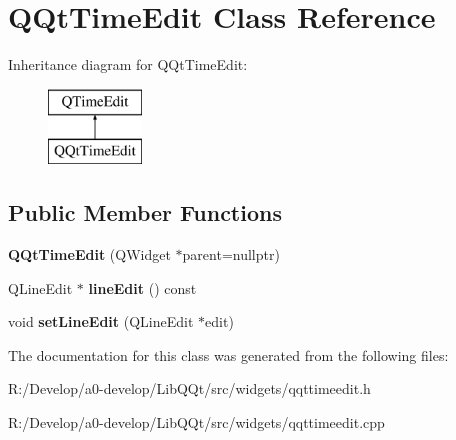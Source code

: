 \hypertarget{class_q_qt_time_edit}{}\section{Q\+Qt\+Time\+Edit Class Reference}
\label{class_q_qt_time_edit}
Inheritance diagram for Q\+Qt\+Time\+Edit\+:\begin{figure}[H]
\begin{center}
\leavevmode
\includegraphics[height=2.000000cm]{class_q_qt_time_edit}
\end{center}
\end{figure}
\subsection*{Public Member Functions}
\begin{DoxyCompactItemize}
\item 
\mbox{\label{class_q_qt_time_edit_a2bc3924b5ea17d6c2279505c8f0780b3}} 
{\bfseries Q\+Qt\+Time\+Edit} (Q\+Widget $\ast$parent=nullptr)
\item 
\mbox{\label{class_q_qt_time_edit_ab08ee9f3d9cba70f94fc7aeec559a99c}} 
Q\+Line\+Edit $\ast$ {\bfseries line\+Edit} () const
\item 
\mbox{\label{class_q_qt_time_edit_ac61b18f8253eb7d70947b04df529fb69}} 
void {\bfseries set\+Line\+Edit} (Q\+Line\+Edit $\ast$edit)
\end{DoxyCompactItemize}


The documentation for this class was generated from the following files\+:\begin{DoxyCompactItemize}
\item 
R\+:/\+Develop/a0-\/develop/\+Lib\+Q\+Qt/src/widgets/qqttimeedit.\+h\item 
R\+:/\+Develop/a0-\/develop/\+Lib\+Q\+Qt/src/widgets/qqttimeedit.\+cpp\end{DoxyCompactItemize}
